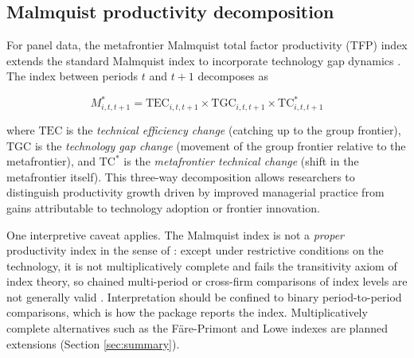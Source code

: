 \begin{table}
\centering
\caption{\label{tab:approaches}Comparison of metafrontier approaches.}
\centering
{}
\end{table}

\subsection{Malmquist productivity decomposition}\label{sec:malmquist-methodology}

For panel data, the metafrontier Malmquist total factor productivity (TFP)
index extends the standard Malmquist index to incorporate technology gap
dynamics \citep{odonnell2008}. The index between periods \(t\) and \(t+1\) decomposes
as

\begin{equation}
M^*_{i,t,t+1} = \text{TEC}_{i,t,t+1} \times \text{TGC}_{i,t,t+1}
\times \text{TC}^*_{i,t,t+1}
\label{eq:malmquist}
\end{equation}

where \(\text{TEC}\) is the \emph{technical efficiency change} (catching up to the
group frontier), \(\text{TGC}\) is the \emph{technology gap change} (movement of the
group frontier relative to the metafrontier), and \(\text{TC}^*\) is the
\emph{metafrontier technical change} (shift in the metafrontier itself). This
three-way decomposition allows researchers to distinguish productivity growth
driven by improved managerial practice from gains attributable to technology
adoption or frontier innovation.

One interpretive caveat applies. The Malmquist index is not a \emph{proper}
productivity index in the sense of \citet{odonnell2012}: except under restrictive
conditions on the technology, it is not multiplicatively complete and fails
the transitivity axiom of index theory, so chained multi-period or
cross-firm comparisons of index levels are not generally valid
\citep{odonnell2018}. Interpretation should be confined to binary
period-to-period comparisons, which is how the package reports the index.
Multiplicatively complete alternatives such as the Färe-Primont and Lowe
indexes are planned extensions (Section \ref{sec:summary}).

